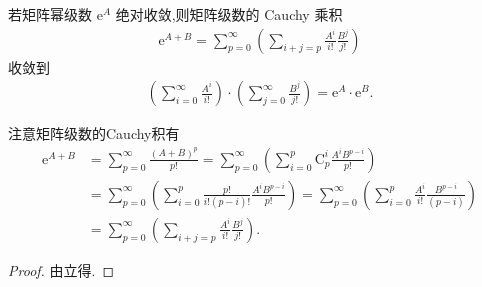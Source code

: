 \documentclass[../../main.tex]{subfiles}%
\begin{document}
\begin{corollary}\label{corollary:矩阵幂级数的绝对收敛性保证了Cauchy乘积的收敛性}
若矩阵幂级数 $\mathrm{e}^A$ 绝对收敛,则矩阵级数的 Cauchy 乘积
\begin{align*}
\mathrm{e}^{A + B}=\sum_{p = 0}^{\infty}\left(\sum_{i + j = p}\frac{A^i}{i!}\frac{B^j}{j!}\right)
\end{align*}
收敛到
\begin{align*}
\left(\sum_{i = 0}^{\infty}\frac{A^i}{i!}\right)\cdot\left(\sum_{j = 0}^{\infty}\frac{B^j}{j!}\right)=\mathrm{e}^A\cdot\mathrm{e}^B.
\end{align*}
\end{corollary}
\begin{remark}
注意矩阵级数的Cauchy积有
\begin{align*}
\mathrm{e}^{A+B}&=\sum_{p=0}^{\infty}{\frac{\left( A+B \right) ^p}{p!}}=\sum_{p=0}^{\infty}{\left( \sum_{i=0}^p{\mathrm{C}_{p}^{i}\frac{A^iB^{p-i}}{p!}} \right)}
\\
&=\sum_{p=0}^{\infty}{\left( \sum_{i=0}^p{\frac{p!}{i!\left( p-i \right) !}\frac{A^iB^{p-i}}{p!}} \right)}=\sum_{p=0}^{\infty}{\left( \sum_{i=0}^p{\frac{A^i}{i!}\frac{B^{p-i}}{\left( p-i \right)}} \right)}
\\
&=\sum_{p=0}^{\infty}{\left( \sum_{i+j=p}{\frac{A^i}{i!}\frac{B^j}{j!}} \right)}.
\end{align*}
\end{remark}
\begin{proof}

由立得.

\end{proof}
\end{document}
